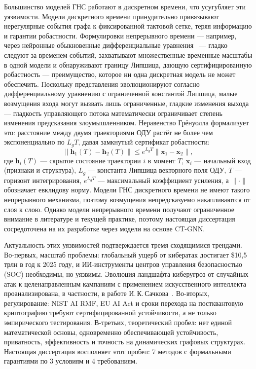 Большинство моделей ГНС работают в дискретном времени, что усугубляет эти уязвимости. Модели дискретного времени принудительно привязывают нерегулярные события графа к фиксированной тактовой сетке, теряя информацию и гарантии робастности. Формулировки непрерывного времени --- например, через нейронные обыкновенные дифференциальные уравнения~\cite{Chen2018,Chamberlain2021,Rusch2022} --- гладко следуют за временем событий, захватывают множественные временные масштабы в одной модели и обнаруживают границу Липшица, дающую сертифицированную робастность --- преимущество, которое ни одна дискретная модель не может обеспечить. Поскольку представления эволюционируют согласно дифференциальному уравнению с ограниченной константой Липшица, малые возмущения входа могут вызвать лишь ограниченные, гладкие изменения выхода --- гладкость управляющего потока математически ограничивает степень изменения предсказания злоумышленником. Неравенство Грёнуолла формализует это: расстояние между двумя траекториями ОДУ растёт не более чем экспоненциально по $L_g T$, давая замкнутый сертификат робастности:
\begin{equation}
\|\mathbf{h}_1(T)-\mathbf{h}_2(T)\|\le e^{L_g T}\|\mathbf{x}_1-\mathbf{x}_2\|,
\label{eq:gronwall}
\end{equation}
где $\mathbf{h}_i(T)$ --- скрытое состояние траектории $i$ в момент $T$, $\mathbf{x}_i$ --- начальный вход (признаки и структура), $L_g$ --- константа Липшица векторного поля ОДУ, $T$ --- горизонт интегрирования, $e^{L_gT}$ --- максимальный коэффициент усиления, а $\|\cdot\|$ обозначает евклидову норму. Модели ГНС дискретного времени не имеют такого непрерывного механизма, поэтому возмущения непредсказуемо накапливаются от слоя к слою. Однако модели непрерывного времени получают ограниченное внимание в литературе и текущей практике, поэтому настоящая диссертация сосредоточена на их разработке через модели на основе CT-GNN.

Актуальность этих уязвимостей подтверждается тремя сходящимися трендами. Во-первых, масштаб проблемы: глобальный ущерб от кибератак достигает \$10,5 трлн в год к 2025 году, и ИИ-инструменты центров управления безопасностью (SOC) необходимы, но уязвимы. Эволюция ландшафта киберугроз от случайных атак к целенаправленным кампаниям с применением искусственного интеллекта проанализирована, в частности, в работе И.\,К.\,Сачкова~\cite{Sachkov2022threat}. Во-вторых, регулирование: NIST AI RMF, EU AI Act и сроки перехода на постквантовую криптографию требуют сертифицированной устойчивости, а не только эмпирического тестирования. В-третьих, теоретический пробел: нет единой математической основы, одновременно обеспечивающей устойчивость, приватность, эффективность и точность на динамических графовых структурах. Настоящая диссертация восполняет этот пробел: 7 методов с формальными гарантиями по 3 условиям и 4 требованиям.

